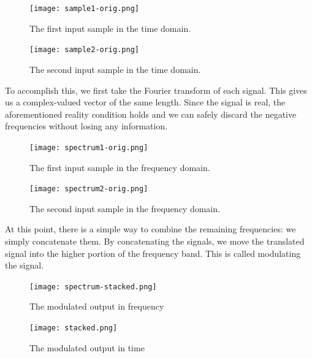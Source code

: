 \documentclass[12pt]{article}
\begin{document}
\begin{figure}[H]
\hspace*{-.35 in}
\begin{minipage}[t]{0.5\linewidth}
\centering
\texttt{[image: sample1-orig.png]}
\caption{The first input sample in the time domain.}
\label{fig:figure1}
\end{minipage}
\hspace{0.5cm}
\begin{minipage}[t]{0.5\linewidth}
\centering
\texttt{[image: sample2-orig.png]}
\caption{The second input sample in the time domain.}
\label{fig:figure2}
\end{minipage}
\end{figure}

\clearpage

To accomplish this, we first take the Fourier transform of each signal. This
gives us a complex-valued vector of the same length. Since the signal is real,
the aforementioned reality condition holds and we can safely discard the
negative frequencies without losing any information. 

\begin{figure}[H]
\hspace*{-.35 in}
\begin{minipage}[t]{0.5\linewidth}
\centering
\texttt{[image: spectrum1-orig.png]}
\caption{The first input sample in the frequency domain.}
\label{fig:figure4}
\end{minipage}
\hspace{0.5cm}
\begin{minipage}[t]{0.5\linewidth}
\centering
\texttt{[image: spectrum2-orig.png]}
\caption{The second input sample in the frequency domain.}
\label{fig:figure4}
\end{minipage}
\end{figure}


At this point, there is
a simple way to combine the remaining frequencies: we simply concatenate them.
By concatenating the signals, we move the translated signal into the higher 
portion of the frequency band. This is called modulating the signal.

\begin{figure}[H]
\hspace*{-.35 in}
\begin{minipage}[t]{0.5\linewidth}
\centering
\texttt{[image: spectrum-stacked.png]}
\caption{The modulated output in frequency}
\label{fig:figure4}
\end{minipage}
\hspace{0.5cm}
\begin{minipage}[t]{0.5\linewidth}
\centering
\texttt{[image: stacked.png]}
\caption{The modulated output in time}
\label{fig:figure4}
\end{minipage}
\end{figure}
\end{document}
